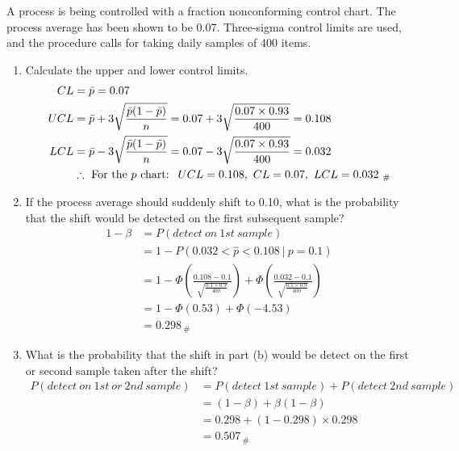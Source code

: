 A process is being controlled with a fraction nonconforming control chart. The process average has been shown to be 0.07. Three-sigma control limits are used, and the procedure calls for taking daily samples of 400 items.

\begin{enumerate}
    \item Calculate the upper and lower control limits.
        \begin{align*}
            CL &= \Bar{p} = 0.07\\
            UCL &= \Bar{p} + 3\sqrt{\frac{\Bar{p}(1 - \Bar{p})}{n}} 
            = 0.07 + 3\sqrt{\frac{0.07 \times 0.93}{400}}
            = 0.108\\
            LCL &= \Bar{p} - 3\sqrt{\frac{\Bar{p}(1 - \Bar{p})}{n}}
            = 0.07 - 3\sqrt{\frac{0.07 \times 0.93}{400}}
            = 0.032\\
            &\therefore \ \text{For the $p$ chart: } \ UCL = 0.108, \ CL = 0.07, \ LCL = 0.032_{\ \#}   
        \end{align*}
        
    \item If the process average should suddenly shift to 0.10, what is the probability that the shift would be detected on the first subsequent sample?
        \begin{align*}
            1 - \beta &= P\left(detect \ on \ 1st \ sample \right)\\
            &= 1 - P(0.032 < \hat{p} < 0.108 \ | \ p = 0.1)\\
            &= 1 - \Phi\left(\frac{0.108 - 0.1}{\sqrt{\frac{0.1 \times 0.9}{400}}} \right) + \Phi\left(\frac{0.032 - 0.1}{\sqrt{\frac{0.1 \times 0.9}{400}}} \right)\\
            &= 1 - \Phi(0.53) + \Phi(-4.53)\\
            &= 0.298_{\ \#}
        \end{align*}
        
    \item What is the probability that the shift in part (b) would be detect on the first or second sample taken after the shift?
        \begin{align*}
            P\left(detect \ on \ 1st \ or \ 2nd \ sample \right) &= P\left(detect \ 1st \ sample \right) + P\left(detect \ 2nd \ sample \right)\\
            &= (1 - \beta) + \beta(1 - \beta)\\
            &= 0.298 + (1 - 0.298) \times 0.298\\
            &= 0.507_{\ \#}\\
        \end{align*}

    \pagebreak
\end{enumerate}